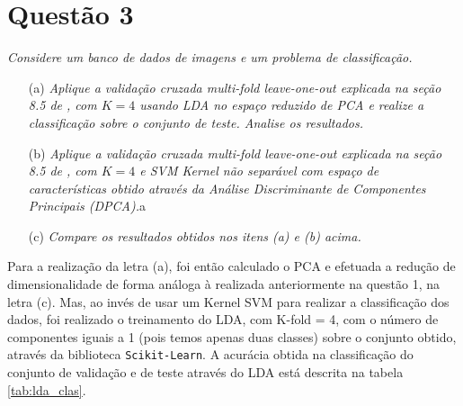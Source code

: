 \documentclass[]{abntex2}
\begin{document}

\section*{\textbf{Questão 3}}

\textit{Considere um banco de dados de imagens e um problema de classificação.}

\begin{enumerate}
    \item[(a)] \textit{ Aplique a validação cruzada multi-fold leave-one-out explicada na seção 8.5 de \cite{book}, com $K = 4$ usando LDA no espaço reduzido de PCA e realize a classificação sobre o conjunto de teste. Analise os resultados.}
    
    \item[(b)] \textit{ Aplique a validação cruzada multi-fold leave-one-out explicada na seção 8.5 de \cite{book}, com $K = 4$ e SVM Kernel não separável com espaço de características obtido através da Análise Discriminante de Componentes Principais (DPCA).}a
    
    \item[(c)] \textit{ Compare os resultados obtidos nos itens (a) e (b) acima.}
\end{enumerate}

Para a realização da letra (a), foi então calculado o PCA e efetuada a redução de dimensionalidade de forma análoga à realizada anteriormente na questão 1, na letra (c). Mas, ao invés de usar um Kernel SVM para realizar a classificação dos dados, foi realizado o treinamento do LDA, com K-fold = 4, com o número de componentes iguais a 1 (pois temos apenas duas classes) sobre o conjunto obtido, através da biblioteca \texttt{Scikit-Learn}. A acurácia obtida na classificação do conjunto de validação e de teste através do LDA está descrita na tabela \ref{tab:lda_clas}.
\end{document}
